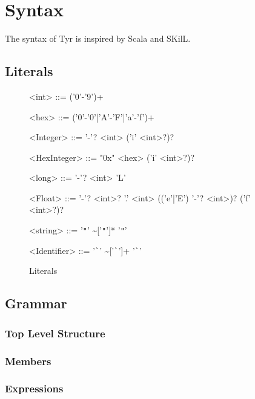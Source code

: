 \section{Syntax}

The syntax of Tyr is inspired by Scala and SKilL.


\subsection{Literals}


\begin{figure}
	\begin{grammar}
		<int> ::= ('0'-'9')+
		
		<hex> ::= ('0'-'0'|'A'-'F'|'a'-'f')+
		
		<Integer> ::= '-'? <int> ('i' <int>?)?
		
		<HexInteger> ::= "0x" <hex> ('i' <int>?)?
		
		<long> ::= '-'? <int> 'L'
		
		<Float> ::= '-'? <int>? '.' <int> (('e'|'E') '-'? <int>)? ('f' <int>?)?
		
		<string> ::= '\verb|"|' \textasciitilde['\verb|"|']* '\verb|"|'
		
		<Identifier> ::= '\verb|`|' \textasciitilde['\verb|`|']+ '\verb|`|'
	\end{grammar}
	\caption{Literals}
	\label{fig:syn:literals}
\end{figure}

\subsection{Grammar}

\subsubsection{Top Level Structure}

\subsubsection{Members}

\subsubsection{Expressions}